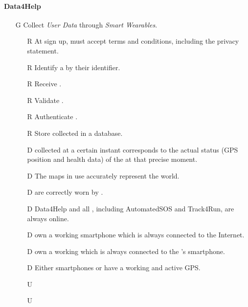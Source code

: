 \documentclass[../../rasd.tex]{subfiles}
\begin{document}
        \paragraph{Data4Help}
        \begin{itemize}

            \item[G\subs{1}]Collect \textit{User Data} through \textit{Smart Wearables}.
            \begin{itemize}
                \item[R\subs{4}]At sign up,  must accept terms and conditions, including the privacy statement.
                \item[R\subs{6}]Identify a  by their identifier.
                \item[R\subs{8}]Receive .
                \item[R\subs{9}]Validate .
                \item[R\subs{10}]Authenticate .
                \item[R\subs{11}]Store collected  in a database.
                \\
                \item[D\subs{2}] collected at a certain instant corresponds to the actual status (GPS position and health data) of the  at that precise moment.              
                \item[D\subs{3}]The maps in use accurately represent the world.
                \item[D\subs{8}] are correctly worn by .
                \item[D\subs{9}]Data4Help and all , including AutomatedSOS and Track4Run, are always online.
                \item[D\subs{10}] own a working smartphone which is always connected to the Internet.
                \item[D\subs{11}] own a working  which is always connected to the 's smartphone.
                \item[D\subs{12}]Either smartphones or  have a working and active GPS.
                \\
                \item[U\subs{1}] 
                \item[U\subs{3}]                      
            \end{itemize}


\end{itemize}
\end{document}

